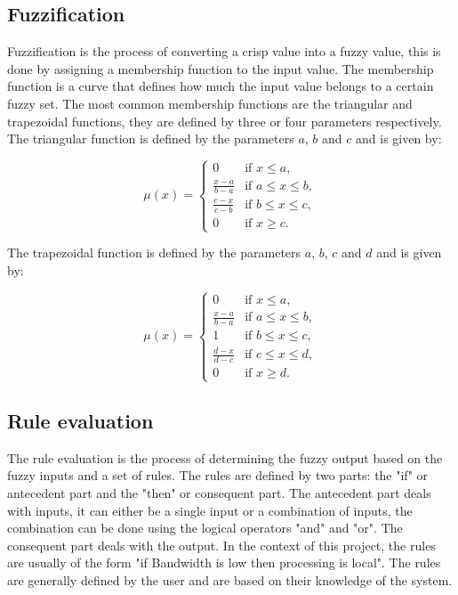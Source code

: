 \subsection{Fuzzification}
\label{subsec:fuzzy-fuzzification}

Fuzzification is the process of converting a crisp value into a fuzzy value, this is done by assigning a membership
function to the input value. The membership function is a curve that defines how much the input value belongs to a
certain fuzzy set. The most common membership functions are the triangular and trapezoidal functions, they are defined
by three or four parameters respectively. The triangular function is defined by the parameters $a$, $b$ and $c$ and
is given by:

\begin{equation}
	\mu(x) = \begin{cases}
		0                   & \text{if } x \leq a,        \\
		\frac{x - a}{b - a} & \text{if } a \leq x \leq b, \\
		\frac{c - x}{c - b} & \text{if } b \leq x \leq c, \\
		0                   & \text{if } x \geq c.
	\end{cases}
\end{equation}

The trapezoidal function is defined by the parameters $a$, $b$, $c$ and $d$ and is given by:

\begin{equation}
	\mu(x) = \begin{cases}
		0                   & \text{if } x \leq a,        \\
		\frac{x - a}{b - a} & \text{if } a \leq x \leq b, \\
		1                   & \text{if } b \leq x \leq c, \\
		\frac{d - x}{d - c} & \text{if } c \leq x \leq d, \\
		0                   & \text{if } x \geq d.
	\end{cases}
\end{equation}

\subsection{Rule evaluation}
\label{subsec:fuzzy-rule-evaluation}

The rule evaluation is the process of determining the fuzzy output based on the fuzzy inputs and a set of rules. The
rules are defined by two parts: the "if" or antecedent part and the "then" or consequent part. The antecedent part
deals with inputs, it can either be a single input or a combination of inputs, the combination can be done using the
logical operators "and" and "or". The consequent part deals with the output. In the context of this project, the rules
are usually of the form "if Bandwidth is low then processing is local". The rules are generally defined by the user
and are based on their knowledge of the system.

